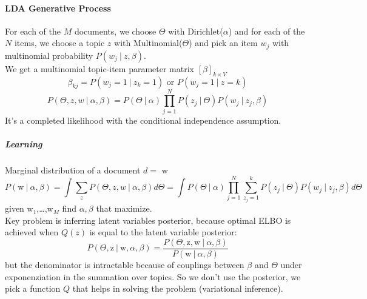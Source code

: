 \documentclass[10pt]{report}
\begin{document}
\paragraph{LDA Generative Process} For each of the $M$ documents, we choose $\Theta$ with Dirichlet($\alpha$) and for each of the $N$ items, we choose a topic $z$ with Multinomial($\Theta$) and pick an item $w_j$ with multinomial probability $P(w_j\:|\:z,\beta)$.\\
We get a multinomial topic-item parameter matrix $[\beta]_{k\times V}$
$$\beta_{kj}=P(w_j=1\:|\:z_k=1)\text{ or } P(w_j=1\:|\:z=k)$$
$$P(\Theta, z, w\:|\:\alpha,\beta) = P(\Theta\:|\:\alpha)\prod_{j=1}^NP(z_j\:|\:\Theta)P(w_j\:|\:z_j,\beta)$$
It's a completed likelihood with the conditional independence assumption.
\subparagraph{Learning} Marginal distribution of a document $d =$ w
$$P(\text{w}\:|\:\alpha,\beta) = \int \sum_z P(\Theta,z,w\:|\:\alpha,\beta)d\Theta=\int P(\Theta\:|\:\alpha)\prod_{j=1}^N\sum_{z_j=1}^kP(z_j\:|\:\Theta)P(w_j\:|\:z_j,\beta)d\Theta$$
given w$_1$,\ldots,w$_M$ find $\alpha,\beta$ that maximize.\\
Key problem is inferring latent variables posterior, because optimal ELBO is achieved when $Q(z)$ is equal to the latent variable posterior:
$$P(\Theta, \text{z}\:|\:\text{w},\alpha,\beta) = \frac{P(\Theta, \text{z}, \text{w}\:|\:\alpha,\beta)}{P(\text{w}\:|\:\alpha,\beta)}$$
but the denominator is intractable because of couplings between $\beta$ and $\Theta$ under exponenziation in the summation over topics. So we don't use the posterior, we pick a function $Q$ that helps in solving the problem (variational inference).
\end{document}
